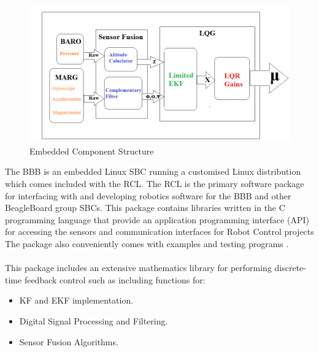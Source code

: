 \documentclass[12pt,a4paper,twoside]{report}
\begin{document}
				\begin{figure}[h!]
					\centering
					\includegraphics[width=1\linewidth]{ImplementationStructure.png}
					\caption{Embedded Component Structure}
					\label{fig:embeddedcomponentstructure}
				\end{figure}
			
				The BBB is an embedded Linux SBC running a customised Linux distribution which comes included with the RCL. The RCL is the primary software package for interfacing with and developing robotics software for the BBB and other BeagleBoard group SBCs. This package contains libraries written in the C programming language that provide an application programming interface (API) for accessing the sensors and communication interfaces for Robot Control projects \cite{31} The package also conveniently comes with examples and testing programs . 
				\\ \\
				This package includes an extensive mathematics library for performing discrete-time feedback control such as including functions for:
				
				\begin{itemize}
					\item
						KF and EKF implementation.
					\item
						Digital Signal Processing and Filtering.
					\item
						Sensor Fusion Algorithms.
				\end{itemize}  
		
\end{document}

